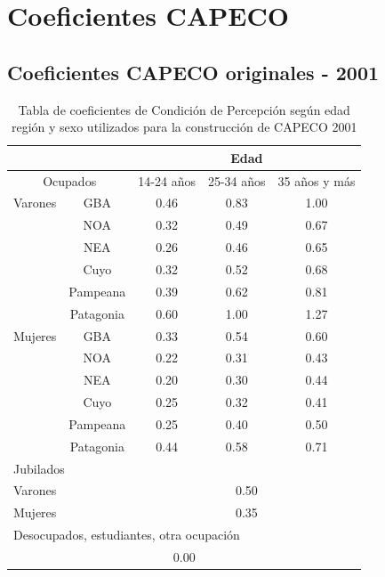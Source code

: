 \section{Coeficientes CAPECO}

\subsection{Coeficientes CAPECO originales - 2001}

\begin{table}[h!]
	\small
	\centering
	\caption{Tabla de coeficientes de Condición de Percepción según edad región y sexo utilizados para la construcción de CAPECO 2001}
	\label{tab:tableCP2001}
	\begin{tabular}{|c|c|c|c|c|}
		\hline
		\multicolumn{2}{|c|}{} & \multicolumn{3}{|c|}{Edad} \\
		\hline
		\multicolumn{2}{|c|}{Ocupados} & 14-24 años & 25-34 años & 35 años y más \\
		\hline
		Varones & GBA & 0.46 & 0.83 & 1.00	\\
		        & NOA & 0.32 & 0.49 & 0.67	\\	
		        & NEA & 0.26 & 0.46 & 0.65	\\	
		        & Cuyo & 0.32 & 0.52 & 0.68	\\
		        & Pampeana & 0.39 & 0.62 & 0.81	\\
		        & Patagonia & 0.60 & 1.00 & 1.27	\\
		\hline
		Mujeres & GBA & 0.33 & 0.54 & 0.60	\\
				& NOA & 0.22 & 0.31 & 0.43	\\	
				& NEA & 0.20 & 0.30 & 0.44	\\	
				& Cuyo & 0.25 & 0.32 & 0.41	\\
				& Pampeana & 0.25 & 0.40 & 0.50	\\
				& Patagonia & 0.44 & 0.58 & 0.71	\\
		\hline
		\multicolumn{5}{|l|}{Jubilados}\\
		\hline
		\multicolumn{2}{|l|}{Varones} & \multicolumn{3}{|c|}{0.50}\\
		\multicolumn{2}{|l|}{Mujeres} & \multicolumn{3}{|c|}{0.35}\\
		\hline   
		\multicolumn{5}{|l|}{Desocupados, estudiantes, otra ocupación}\\
		\hline
		\multicolumn{5}{|c|}{0.00}\\
		
	\end{tabular}
\end{table}

